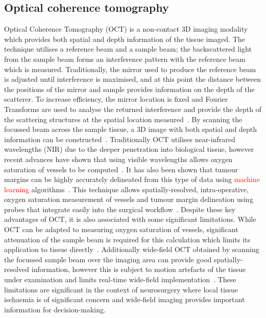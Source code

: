 \subsection{Optical coherence tomography}
Optical Coherence Tomography (OCT) is a non-contact 3D imaging modality which provides both spatial and depth information of the tissue imaged. The technique utilises a reference beam and a sample beam; the backscattered light from the sample beam forms an interference pattern with the reference beam which is measured. Traditionally, the mirror used to produce the reference beam is adjusted until interference is maximised, and at this point the distance between the positions of the mirror and sample provides information on the depth of the scatterer. To increase efficiency, the mirror location is fixed and Fourier Transforms are used to analyse the returned interference and provide the depth of the scattering structures at the spatial location measured~\citep{Fercher2003}. By scanning the focussed beam across the sample tissue, a 3D image with both spatial and depth information can be constructed~\citep{Fercher2003}. Traditionally OCT utilises near-infrared wavelengths (NIR) due to the deeper penetration into biological tissue, however recent advances have shown that using visible wavelengths allows oxygen saturation of vessels to be computed~\citep{Shu2017}. It has also been shown that tumour margins can be highly accurately delineated from this type of data using \textcolor{red}{machine learning} algorithms~\citep{Sunny2019}. 
This technique allows spatially-resolved, intra-operative, oxygen saturation measurement of vessels and tumour margin delineation using probes that integrate easily into the surgical workflow~\citep{Jansen2018}. Despite these key advantages of OCT, it is also associated with some significant limitations. While OCT can be adapted to measuring oxygen saturation of vessels, significant attenuation of the sample beam is required for this calculation which limits its application to tissue directly~\citep{Shu2017}. Additionally wide-field OCT obtained by scanning the focussed sample beam over the imaging area can provide good spatially-resolved information, however this is subject to motion artefacts of the tissue under examination and limits real-time wide-field implementation~\citep{Yu2015}. These limitations are significant in the context of neurosurgery where local tissue ischaemia is of significant concern and wide-field imaging provides important information for decision-making. 

